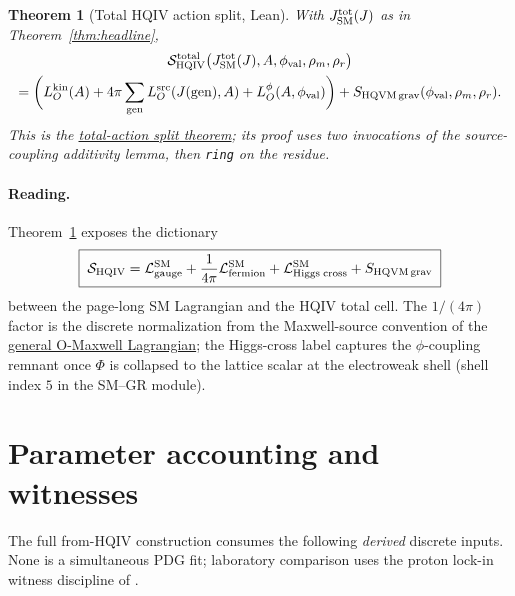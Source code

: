 \documentclass[11pt]{amsart}
\newtheorem{theorem}{Theorem}[section]
\begin{document}
\begin{theorem}[Total HQIV action split, Lean]
\label{thm:total-split-lean}
With $J_{\rm SM}^{\rm tot}(J)$ as in Theorem~\ref{thm:headline},
\begin{multline*}
\mathcal{S}_{\mathrm{HQIV}}^{\mathrm{total}}\bigl(J_{\rm SM}^{\rm tot}(J),A,\phi_{\rm val},\rho_m,\rho_r\bigr)
\\
= \biggl(L_O^{\rm kin}(A)
+ 4\pi\sum_{\rm gen} L_O^{\rm src}(J({\rm gen}),A)
+ L_O^\phi(A,\phi_{\rm val})\biggr) + S_{\rm HQVM\,grav}(\phi_{\rm val},\rho_m,\rho_r).
\end{multline*}
This is the \hyperref[lean:total-split]{total-action split theorem}; its
proof uses two invocations of the source-coupling additivity lemma, then
\texttt{ring} on the residue.
\end{theorem}

\paragraph{Reading.}
Theorem~\ref{thm:total-split-lean} exposes the dictionary
\[
\boxed{\;
\mathcal{S}_{\rm HQIV}
= \mathcal{L}_{\rm gauge}^{\rm SM}
+ \frac{1}{4\pi}\mathcal{L}_{\rm fermion}^{\rm SM}
+ \mathcal{L}_{\rm Higgs\;cross}^{\rm SM}
+ S_{\rm HQVM\,grav}
\;}
\]
between the page-long SM Lagrangian and the HQIV total cell. The
$1/(4\pi)$ factor is the discrete normalization from the Maxwell-source
convention of the \hyperref[lean:LO-maxwell]{general O-Maxwell Lagrangian};
the Higgs-cross label captures the $\phi$-coupling remnant once $\Phi$ is
collapsed to the lattice scalar at the electroweak shell (shell index $5$ in
the SM--GR module).

\section{Parameter accounting and witnesses}
\label{sec:parameters}

The full from-HQIV construction consumes the following \emph{derived}
discrete inputs. None is a simultaneous PDG fit; laboratory comparison uses
the proton lock-in witness discipline of
\cite{hqiv-mass-spectrum-paper,hqiv-kirchhoff-paper}.
\end{document}
